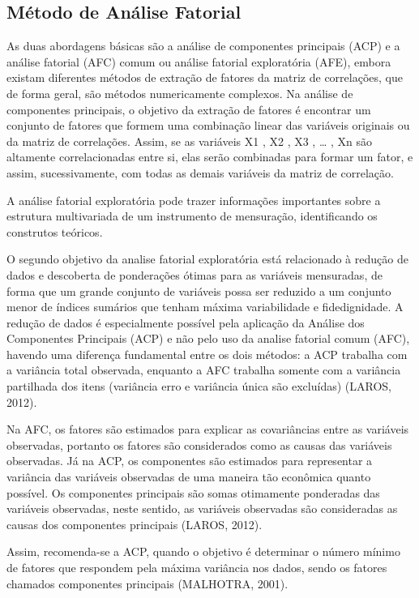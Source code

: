 \documentclass[12pt,brazil,oneside]{book}
\begin{document}
\hypertarget{metodo-de-analise-fatorial}{%
\subsection{Método de Análise Fatorial}\label{metodo-de-analise-fatorial}}

As duas abordagens básicas são a análise de componentes principais (ACP) e a análise fatorial (AFC) comum ou análise fatorial exploratória (AFE), embora existam diferentes métodos
de extração de fatores da matriz de correlações, que de forma geral, são métodos numericamente complexos. Na análise de componentes principais, o objetivo da extração de fatores é encontrar um conjunto de fatores que formem uma combinação linear das variáveis originais ou da matriz de correlações. Assim, se as variáveis X1 , X2 , X3 , \ldots{} , Xn são altamente correlacionadas entre si, elas serão combinadas para formar um fator, e assim, sucessivamente, com todas as demais variáveis
da matriz de correlação.

A análise fatorial exploratória pode trazer informações importantes sobre a estrutura multivariada de um instrumento de mensuração, identificando os construtos teóricos.

O segundo objetivo da analise fatorial exploratória está relacionado à redução de dados e descoberta de ponderações ótimas para as variáveis mensuradas, de forma que um grande conjunto de variáveis possa ser reduzido a um conjunto menor de índices sumários que tenham máxima variabilidade e fidedignidade. A redução de dados é especialmente possível pela aplicação da Análise dos Componentes Principais (ACP) e não pelo uso da analise fatorial comum (AFC), havendo uma diferença fundamental entre os dois métodos: a ACP trabalha com a variância total observada, enquanto a AFC trabalha somente com a variância partilhada dos itens (variância erro e variância única são excluídas) (LAROS, 2012).

Na AFC, os fatores são estimados para explicar as covariâncias entre as variáveis observadas, portanto os fatores são considerados como as causas das variáveis observadas. Já na ACP, os componentes são estimados para representar a variância das variáveis observadas de uma maneira tão econômica quanto possível. Os componentes principais são somas otimamente ponderadas das variáveis observadas, neste sentido, as variáveis observadas são consideradas as causas dos componentes principais (LAROS, 2012).

Assim, recomenda-se a ACP, quando o objetivo é determinar o número mínimo de fatores que respondem pela máxima variância nos dados, sendo os fatores chamados componentes principais (MALHOTRA, 2001).
\end{document}
